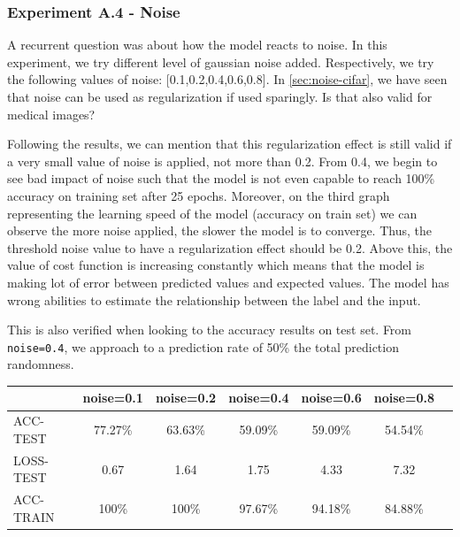 \documentclass[11pt, openany]{report}
\theoremstyle{plain}
\theoremstyle{definition}
\theoremstyle{remark}
\begin{document}
\subsubsection{Experiment A.4 - Noise} \label{sec:noise-allidb1}

A recurrent question was about how the model reacts to noise. In this experiment, we try different level of gaussian noise added. Respectively, we try the following values of noise: [0.1,0.2,0.4,0.6,0.8]. In \autoref{sec:noise-cifar}, we have seen that noise can be used as regularization if used sparingly. Is that also valid for medical images? 

Following the results, we can mention that this regularization effect is still valid if a very small value of noise is applied, not more than 0.2. From 0.4, we begin to see bad impact of noise such that the model is not even capable to reach 100\% accuracy on training set after 25 epochs. Moreover, on the third graph representing the learning speed of the model (accuracy on train set) we can observe the more noise applied, the slower the model is to converge. Thus, the threshold noise value to have a regularization effect should be 0.2. Above this, the value of cost function is increasing constantly which means that the model is making lot of error between predicted values and expected values. The model has wrong abilities to estimate the relationship between the label and the input. 

This is also verified when looking to the accuracy results on test set. From \texttt{noise=0.4}, we approach to a prediction rate of 50\% the total prediction randomness.    

\begin{center}
\begin{tabular}{|l|c|c|c|c|c|c|}
  \hline
   & \textbf{noise=0.1} & \textbf{noise=0.2} & \textbf{noise=0.4} & \textbf{noise=0.6} & \textbf{noise=0.8}\\
  \hline
  ACC-TEST & 77.27\% & 63.63\% & 59.09\% & 59.09\% & 54.54\%\\
  LOSS-TEST & 0.67 & 1.64 & 1.75 & 4.33  & 7.32\\ 
  ACC-TRAIN & 100\% & 100\% & 97.67\% & 94.18\% & 84.88\% \\ 
  \hline
\end{tabular}
\label{table:results-A4}
\end{center}
\end{document}
